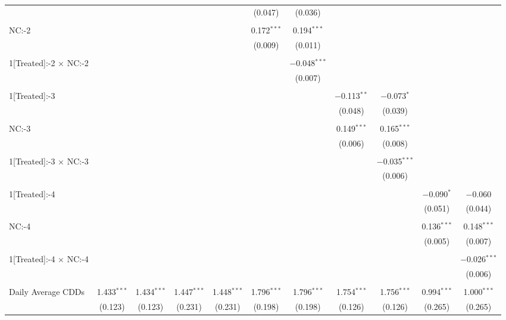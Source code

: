 \begin{table}[!htbp]
\begin{tabular}{@{\extracolsep{5pt}}lcccccccccc}
  &  &  &  &  & (0.047) & (0.036) &  &  &  &  \\ 
  & & & & & & & & & & \\ 
 NC:-2 &  &  &  &  & 0.172$^{***}$ & 0.194$^{***}$ &  &  &  &  \\ 
  &  &  &  &  & (0.009) & (0.011) &  &  &  &  \\ 
  & & & & & & & & & & \\ 
 1[Treated]:-2 $\times$ NC:-2 &  &  &  &  &  & $-$0.048$^{***}$ &  &  &  &  \\ 
  &  &  &  &  &  & (0.007) &  &  &  &  \\ 
  & & & & & & & & & & \\ 
 1[Treated]:-3 &  &  &  &  &  &  & $-$0.113$^{**}$ & $-$0.073$^{*}$ &  &  \\ 
  &  &  &  &  &  &  & (0.048) & (0.039) &  &  \\ 
  & & & & & & & & & & \\ 
 NC:-3 &  &  &  &  &  &  & 0.149$^{***}$ & 0.165$^{***}$ &  &  \\ 
  &  &  &  &  &  &  & (0.006) & (0.008) &  &  \\ 
  & & & & & & & & & & \\ 
 1[Treated]:-3 $\times$ NC:-3 &  &  &  &  &  &  &  & $-$0.035$^{***}$ &  &  \\ 
  &  &  &  &  &  &  &  & (0.006) &  &  \\ 
  & & & & & & & & & & \\ 
 1[Treated]:-4 &  &  &  &  &  &  &  &  & $-$0.090$^{*}$ & $-$0.060 \\ 
  &  &  &  &  &  &  &  &  & (0.051) & (0.044) \\ 
  & & & & & & & & & & \\ 
 NC:-4 &  &  &  &  &  &  &  &  & 0.136$^{***}$ & 0.148$^{***}$ \\ 
  &  &  &  &  &  &  &  &  & (0.005) & (0.007) \\ 
  & & & & & & & & & & \\ 
 1[Treated]:-4 $\times$ NC:-4 &  &  &  &  &  &  &  &  &  & $-$0.026$^{***}$ \\ 
  &  &  &  &  &  &  &  &  &  & (0.006) \\ 
  & & & & & & & & & & \\ 
 Daily Average CDDs & 1.433$^{***}$ & 1.434$^{***}$ & 1.447$^{***}$ & 1.448$^{***}$ & 1.796$^{***}$ & 1.796$^{***}$ & 1.754$^{***}$ & 1.756$^{***}$ & 0.994$^{***}$ & 1.000$^{***}$ \\ 
  & (0.123) & (0.123) & (0.231) & (0.231) & (0.198) & (0.198) & (0.126) & (0.126) & (0.265) & (0.265) \\ 

\end{tabular}
\end{table}
